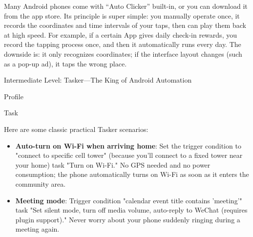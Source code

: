 
Many Android phones come with “Auto Clicker” built-in, or you can download it from the app store. Its principle is super simple: you manually operate once, it records the coordinates and time intervals of your taps, then can play them back at high speed. For example, if a certain App gives daily check-in rewards, you record the tapping process once, and then it automatically runs every day. The downside is: it only recognizes coordinates; if the interface layout changes (such as a pop-up ad), it taps the wrong place.

Intermediate Level: Tasker—The King of Android Automation


Profile


Task


Here are some classic practical Tasker scenarios:

\begin{itemize}
  \item \textbf{Auto-turn on Wi-Fi when arriving home}: Set the trigger condition to "connect to specific cell tower" (because you'll connect to a fixed tower near your home) task "Turn on Wi-Fi." No GPS needed and no power consumption; the phone automatically turns on Wi-Fi as soon as it enters the community area.
  \item \textbf{Meeting mode}: Trigger condition "calendar event title contains 'meeting'" task "Set silent mode, turn off media volume, auto-reply to WeChat (requires plugin support)." Never worry about your phone suddenly ringing during a meeting again.
\end{itemize}

